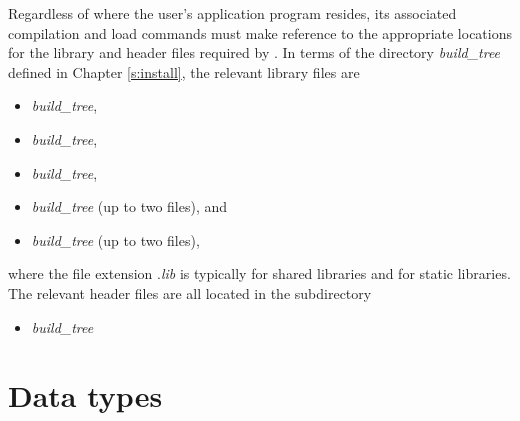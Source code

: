 Regardless of where the user's application program resides, its
associated compilation and load commands must make reference to the
appropriate locations for the library and header files required by
{\ida}.  In terms of the directory {\em build\_tree} defined in
Chapter \ref{s:install}, the relevant library files are
\begin{itemize}
\item {\em build\_tree},
\item {\em build\_tree},
\item {\em build\_tree},
\item {\em build\_tree} (up to two files), and
\item {\em build\_tree} (up to two files),
\end{itemize}
where the file extension .{\em lib} is typically  for shared libraries
and  for static libraries. The relevant header files are all located in
the subdirectory
\begin{itemize}
\item {\em build\_tree}
\end{itemize}


\section{Data types}\label{s:types}


